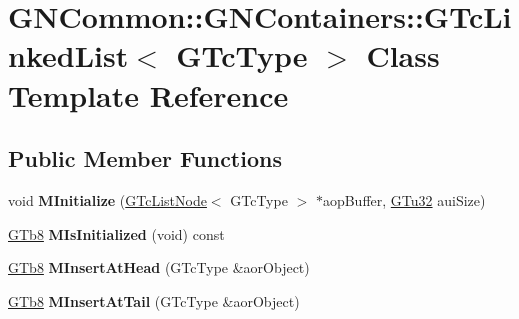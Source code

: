 \hypertarget{class_g_n_common_1_1_g_n_containers_1_1_g_tc_linked_list}{}\section{G\+N\+Common\+:\+:G\+N\+Containers\+:\+:G\+Tc\+Linked\+List$<$ G\+Tc\+Type $>$ Class Template Reference}
\label{class_g_n_common_1_1_g_n_containers_1_1_g_tc_linked_list}
\subsection*{Public Member Functions}
\begin{DoxyCompactItemize}
\item 
\mbox{\label{class_g_n_common_1_1_g_n_containers_1_1_g_tc_linked_list_a518200cd19bae250a9ba97924c983bb5}} 
void {\bfseries M\+Initialize} (\mbox{\hyperlink{class_g_n_common_1_1_g_n_containers_1_1_g_tc_list_node}{G\+Tc\+List\+Node}}$<$ G\+Tc\+Type $>$ $\ast$aop\+Buffer, \mbox{\hyperlink{namespace_g_n_common_ae5485474bc8f23e462e920a17b377b53}{G\+Tu32}} aui\+Size)
\item 
\mbox{\label{class_g_n_common_1_1_g_n_containers_1_1_g_tc_linked_list_ac8baca8da25b4cc84697491d5958c98b}} 
\mbox{\hyperlink{namespace_g_n_common_a6b5283329f609e2175dd0c91fc1520ba}{G\+Tb8}} {\bfseries M\+Is\+Initialized} (void) const
\item 
\mbox{\label{class_g_n_common_1_1_g_n_containers_1_1_g_tc_linked_list_aa0f6acade55d81941d00d8cb232189f7}} 
\mbox{\hyperlink{namespace_g_n_common_a6b5283329f609e2175dd0c91fc1520ba}{G\+Tb8}} {\bfseries M\+Insert\+At\+Head} (G\+Tc\+Type \&aor\+Object)
\item 
\mbox{\label{class_g_n_common_1_1_g_n_containers_1_1_g_tc_linked_list_a481b86e6615c53a1825de2a21d7ecbca}} 
\mbox{\hyperlink{namespace_g_n_common_a6b5283329f609e2175dd0c91fc1520ba}{G\+Tb8}} {\bfseries M\+Insert\+At\+Tail} (G\+Tc\+Type \&aor\+Object)
\item 
\mbox{\label{class_g_n_common_1_1_g_n_containers_1_1_g_tc_linked_list_af6146b5588299c553900fec7a66bca76}} 

\end{DoxyCompactItemize}
